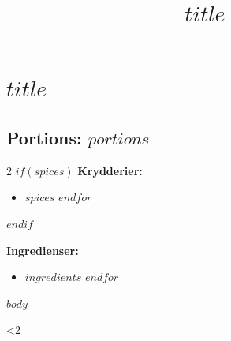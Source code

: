 \documentclass[twoside]{article}
\title{$title$}
\author{}
\date{}
\begin{document}
\section*{\Large $title$}
\subsection*{\normalsize Portions: $portions$}

\begin{multicols}{2}
$if(spices)$
\textbf{Krydderier:}
\begin{itemize}[noitemsep,topsep=0pt]
$for(spices)$
\item $spices$
$endfor$

\end{itemize}
$endif$

\columnbreak

\textbf{Ingredienser:}
\begin{itemize}[noitemsep,topsep=0pt]
$for(ingredients)$
\item $ingredients$
$endfor$

\end{itemize}
\end{multicols}

$body$

\clearpage
\ifnum\thetotalpages<2
\newpage
\null
\clearpage
\fi
\end{document}
